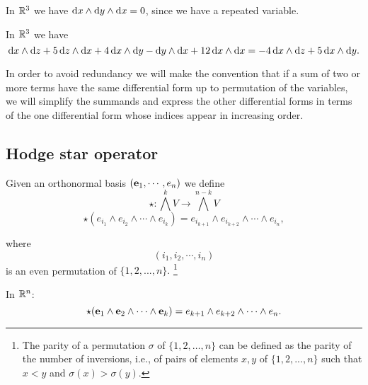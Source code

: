 \begin{exa}
In $\mathbb{R}^3$ we have $\d{x}\wedge \d{y} \wedge \d{x} = 0$, since we
have a repeated variable.
\end{exa}
\begin{exa}
In $\mathbb{R}^3$ we have $$\d{x}\wedge \d{z}  + 5 \d{z}\wedge \d{x} + 4
\d{x}\wedge \d{y} - \d{y}\wedge \d{x} + 12\d{x}\wedge \d{x} =
-4\d{x}\wedge \d{z} + 5\d{x}\wedge \d{y}.$$
\end{exa}

\begin{rem}
In order to avoid redundancy we will make the convention that if a
sum of two or more terms have the same differential form up to
permutation of the variables, we will simplify the summands and
express the other differential forms in terms of the one
differential form whose indices appear in increasing order.
\end{rem}




\subsection{Hodge star operator}
 

Given an orthonormal basis $(\mathbf{ e}_1,\cdots,e_n)$ we define 
\[\star : \bigwedge^{k} V \to \bigwedge^{n-k} V\]
\[\star (e_{i_1} \wedge e_{i_2}\wedge \cdots \wedge e_{i_k})= e_{i_{k+1}} \wedge e_{i_{k+2}} \wedge \cdots \wedge e_{i_n},\]

where \[(i_1, i_2, \cdots, i_n)\] is an even permutation of $\{1, 2, ..., n\}.$ \footnote{The parity of a permutation $\sigma$ of   $\{1, 2, \dots, n\}$  can be defined as the parity of the number of inversions, i.e., of pairs of elements $x,y$ of $\{1, 2, ..., n\}$ such that $x < y$ and $\displaystyle \sigma (x)>\sigma (y)$.
}






\begin{example} In $\mathbb{R}^n$:
\[\star (\mathbf{ e}_1\wedge \mathbf{ e}_2\wedge \cdots \wedge \mathbf{ e}_k)= e_{k+1}\wedge e_{k+2}\wedge \cdots \wedge e_n.\]
\end{example}

